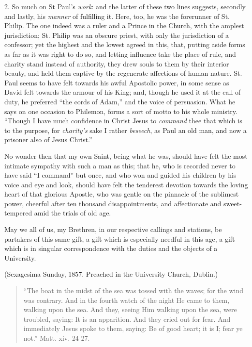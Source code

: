 2. So much on St Paul's \emph{work}: and the latter of these
two lines suggests, secondly and lastly, his \emph{manner} of
fulfilling it. Here, too, he was the forerunner of St.
Philip. The one indeed was a ruler and a Prince in the
Church, with the amplest jurisdiction; St. Philip was an
obscure priest, with only the jurisdiction of a
confessor; yet the highest and the lowest agreed in this,
that, putting aside forms as far as it was right to do
so, and letting influence take the place of rule, and
charity stand instead of authority, they drew souls to
them by their interior beauty, and held them captive by
the regenerate affections of human nature. St. Paul seems
to have felt towards his awful Apostolic power, in some
sense as David felt towards the armour of his King; and,
though he used it at the call of duty, he preferred
``the cords of Adam,'' and the voice of
persuasion. What he says on one occasion to Philemon,
forms a sort of motto to his whole ministry. ``Though
I have much confidence in Christ Jesus to \emph{command}
thee that which is to the purpose, for \emph{charity's}
sake I rather \emph{beseech}, as Paul an old man, and now
a prisoner also of Jesus Christ.''

No wonder then that my own Saint, being what he was,
should have felt the most intimate sympathy with such a
man as this; that he, who is recorded never to have said
``I command'' but once, and who won and guided
his children by his voice and eye and look, should have
felt the tenderest devotion towards the loving heart of
that glorious Apostle, who was gentle on the pinnacle of
the sublimest power, cheerful after ten thousand
disappointments, and affectionate and sweet-tempered amid
the trials of old age.

May we all of us, my Brethren, in our respective
callings and stations, be partakers of this same gift, a
gift which is especially needful in this age, a gift
which is in singular correspondence with the duties and
the objects of a University.

(Sexagesima Sunday, 1857. Preached in the University
Church, Dublin.)


\begin{quote}

``The boat in the midst of the sea was tossed
with the waves; for the wind was contrary. And in the
fourth watch of the night He came to them, walking
upon the sea. And they, seeing Him walking upon the
sea, were troubled, saying: It is an apparition. And
they cried out for fear. And immediately Jesus spoke
to them, saying: Be of good heart; it is I; fear ye
not.'' Matt. xiv. 24-27.

\end{quote}

